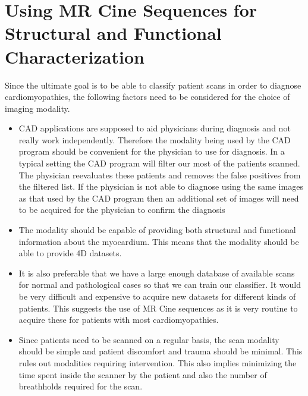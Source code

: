 \section{Using MR Cine Sequences for Structural and Functional Characterization}
\label{sec:modality}

Since the ultimate goal is to be able to classify patient scans in order to diagnose cardiomyopathies, the following factors need to be considered for the choice of imaging modality.
\begin{itemize}
\item CAD applications are supposed to aid physicians during diagnosis and not really work independently. Therefore the modality being used by the CAD program should be convenient for the physician to use for diagnosis. In a typical setting the CAD program will filter our most of the patients scanned. The physician reevaluates these patients and removes the false positives from the filtered list. If the physician is not able to diagnose using the same images as that used by the CAD program then an additional set of images will need to be acquired for the physician to confirm the diagnosis  
\item The modality should be capable of providing both structural and functional information about the myocardium. This means that the modality should be able to provide 4D datasets. 
\item It is also preferable that we have a large enough database of available scans for normal and pathological cases so that we can train our classifier. It would be very difficult and expensive to acquire new datasets for different kinds of patients. This suggests the use of MR Cine sequences as it is very routine to acquire these for patients with most cardiomyopathies.
\item Since patients need to be scanned on a regular basis, the scan modality should be simple and patient discomfort and trauma should be minimal. This rules out modalities requiring intervention. This also implies minimizing the time spent inside the scanner by the patient and also the number of breathholds required for the scan.
\end{itemize} 

